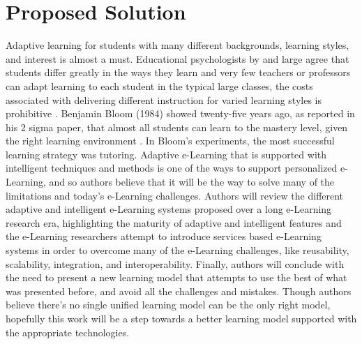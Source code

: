 \documentclass[12pt,a4paper,final,twoside,onecolumn,titlepage]{book}
\begin{document}
\section{Proposed Solution}
Adaptive learning for students with many different backgrounds, learning styles, and interest is almost a must. Educational psychologists by and large agree that students differ greatly in the ways they learn and very few teachers or professors can adapt learning to each student in the typical large classes, the costs associated with delivering different instruction for varied learning styles is prohibitive \cite{R07}. Benjamin Bloom (1984) showed twenty-five years ago, as reported in his 2 sigma paper, that almost all students can learn to the mastery level, given the right learning environment \cite{R09}. In Bloom’s experiments, the most successful learning strategy was tutoring. Adaptive e-Learning that is supported with intelligent techniques and methods is one of the ways to support personalized e-Learning, and so authors believe that it will be the way to solve many of the limitations and today’s e-Learning challenges. Authors will review the different adaptive and intelligent e-Learning systems proposed over a long e-Learning research era, highlighting the maturity of adaptive and intelligent features and the e-Learning researchers attempt to introduce services based e-Learning systems in order to overcome many of the e-Learning challenges, like reusability, scalability, integration, and interoperability. Finally, authors will conclude with the need to present a new learning model that attempts to use the best of what was presented before, and avoid all the challenges and mistakes. Though authors believe there’s no single unified learning model can be the only right model, hopefully this work will be a step towards a better learning model supported with the appropriate technologies.
\end{document}

